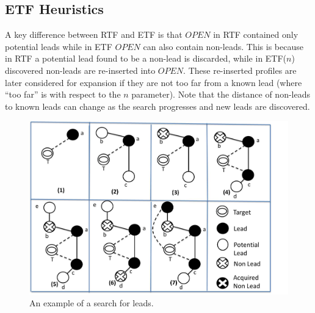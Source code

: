 \documentclass[prodmode,acmtecs]{acmsmall} %
\newcommand{\note}[2]{\textbf{\textsc{#1} says: \textit{#2}}}
\begin{document}
\subsection{ETF Heuristics}
A key difference between RTF and ETF is that $OPEN$ in RTF contained only potential leads while in ETF $OPEN$ can also contain non-leads. This is because in RTF a potential lead found to be a non-lead is discarded, while in ETF($n$) discovered non-leads are re-inserted into $OPEN$. These re-inserted profiles are later considered for expansion if they are not too far from a known lead (where ``too far'' is with respect to the $n$ parameter). %
Note that the distance of non-leads to known leads can change as the search progresses and new leads are discovered.

\begin{figure}[t!]

  \centering
	 \includegraphics[width=0.75\linewidth]{process-and-legend-new.jpg}
  \caption{An example of a search for leads.}\label{fig:etf_process-and-legend}
\end{figure}
\end{document}
